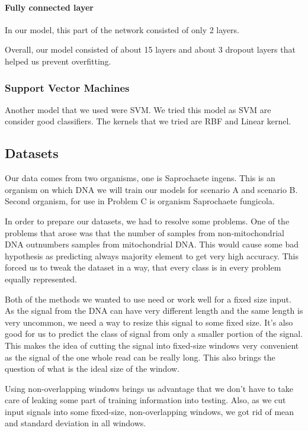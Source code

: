 \paragraph{Fully connected layer}

In our model, this part of the network consisted of only 2 layers.

Overall, our model consisted of about 15 layers and about 3 dropout layers that
helped us prevent overfitting.

\subsubsection{Support Vector Machines}

Another model that we used were SVM. We tried this model as SVM are consider good
classifiers. The kernels that we tried are RBF and Linear kernel.

\subsection{Datasets}

Our data comes from two organisms, one is Saprochaete ingens. This is an organism
on which DNA we will train our models for scenario A and scenario B. Second organism,
for use in Problem C is organism Saprochaete fungicola.

In order to prepare our datasets, we had to resolve some problems. One of the
problems that arose was that the number of samples from non-mitochondrial DNA
outnumbers samples from mitochondrial DNA. This would cause some bad hypothesis
as predicting always majority element to get very high accuracy. This forced us
to tweak the dataset in a way, that every class is in every problem equally represented.

Both of the methods we wanted to use need or work well for a fixed size input.
As the signal from the DNA can have very different length and the same length is
very uncommon, we need a way to resize this signal to some fixed size. It’s also
good for us to predict the class of signal from only a smaller portion of the signal.
This makes the idea of cutting the signal into fixed-size windows very convenient
as the signal of the one whole read can be really long. This also brings the question
of what is the ideal size of the window.

Using non-overlapping windows brings us advantage that we don't have to take care
of leaking some part of training information into testing. Also, as we cut input
signals into some fixed-size, non-overlapping windows, we got rid of mean and
standard deviation in all windows.


